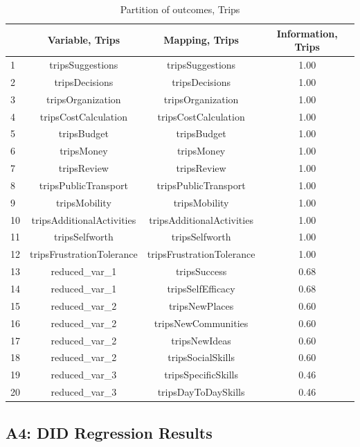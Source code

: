 \documentclass[12pt, a4paper, titlepage]{article}\usepackage[]{graphicx}\usepackage[]{color}
\begin{document}
\begin{table}[ht]
\centering
\begin{tabular}{lccc}
  \hline
 & Variable, Trips & Mapping, Trips & Information, Trips \\ 
  \hline
1 & tripsSuggestions & tripsSuggestions & 1.00 \\ 
  2 & tripsDecisions & tripsDecisions & 1.00 \\ 
  3 & tripsOrganization & tripsOrganization & 1.00 \\ 
  4 & tripsCostCalculation & tripsCostCalculation & 1.00 \\ 
  5 & tripsBudget & tripsBudget & 1.00 \\ 
  6 & tripsMoney & tripsMoney & 1.00 \\ 
  7 & tripsReview & tripsReview & 1.00 \\ 
  8 & tripsPublicTransport & tripsPublicTransport & 1.00 \\ 
  9 & tripsMobility & tripsMobility & 1.00 \\ 
  10 & tripsAdditionalActivities & tripsAdditionalActivities & 1.00 \\ 
  11 & tripsSelfworth & tripsSelfworth & 1.00 \\ 
  12 & tripsFrustrationTolerance & tripsFrustrationTolerance & 1.00 \\ 
  13 & reduced\_var\_1 & tripsSuccess & 0.68 \\ 
  14 & reduced\_var\_1 & tripsSelfEfficacy & 0.68 \\ 
  15 & reduced\_var\_2 & tripsNewPlaces & 0.60 \\ 
  16 & reduced\_var\_2 & tripsNewCommunities & 0.60 \\ 
  17 & reduced\_var\_2 & tripsNewIdeas & 0.60 \\ 
  18 & reduced\_var\_2 & tripsSocialSkills & 0.60 \\ 
  19 & reduced\_var\_3 & tripsSpecificSkills & 0.46 \\ 
  20 & reduced\_var\_3 & tripsDayToDaySkills & 0.46 \\ 
   \hline
\end{tabular}
\caption{Partition of outcomes, Trips} 
\label{partitiontrips}
\end{table}




\subsection{A4: DID Regression Results}
\end{document}
